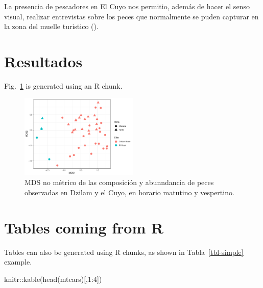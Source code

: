 \documentclass[
  authoryear,
  preprint,
  3p]{elsarticle}
\newenvironment{Shaded}{\begin{snugshade}}{\end{snugshade}}
\newcommand{\DecValTok}[1]{\textcolor[rgb]{0.68,0.00,0.00}{#1}}
\newcommand{\FunctionTok}[1]{\textcolor[rgb]{0.28,0.35,0.67}{#1}}
\newcommand{\NormalTok}[1]{\textcolor[rgb]{0.00,0.23,0.31}{#1}}
\newcommand{\SpecialCharTok}[1]{\textcolor[rgb]{0.37,0.37,0.37}{#1}}
\begin{document}
La presencia de pescadores en El Cuyo nos permitio, además de hacer el
senso visual, realizar entrevistas sobre los peces que normalmente se
puden capturar en la zona del muelle turistico ().

\hypertarget{resultados}{%
\section{Resultados}\label{resultados}}

Fig.~\ref{fig-mds} is generated using an R chunk.

\begin{figure}

{\centering \includegraphics[width=0.5\textwidth,height=\textheight]{Reporte_Campo_files/figure-pdf/fig-mds-1.pdf}

}

\caption{\label{fig-mds}MDS no métrico de las composición y abunndancia
de peces observadas en Dzilam y el Cuyo, en horario matutino y
vespertino.}

\end{figure}

\hypertarget{tables-coming-from-r}{%
\section{Tables coming from R}\label{tables-coming-from-r}}

Tables can also be generated using R chunks, as shown in
Tabla~\ref{tbl-simple} example.

\begin{Shaded}
\begin{Highlighting}[]
\NormalTok{knitr}\SpecialCharTok{::}\FunctionTok{kable}\NormalTok{(}\FunctionTok{head}\NormalTok{(mtcars)[,}\DecValTok{1}\SpecialCharTok{:}\DecValTok{4}\NormalTok{])}
\end{Highlighting}
\end{Shaded}
\end{document}
